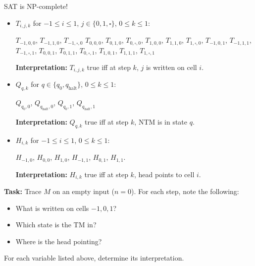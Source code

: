 \documentclass{beamer}
\begin{document}
\begin{frame}{SAT is NP-complete!}
\begin{itemize}
    \item $T_{i, j, k}$ for $-1 \leq i \leq 1$, $j \in \{0, 1, \square\}$, $0 \leq k \leq 1$:
    
   $T_{-1, 0, 0}$, $T_{-1, 1, 0}$, $T_{-1, \square, 0}$ $T_{0, 0, 0}$, $T_{0, 1, 0}$, $T_{0, \square, 0}$, $T_{1, 0, 0}$, $T_{1, 1, 0}$, $T_{1, \square, 0}$,
   $T_{-1, 0, 1}$, $T_{-1, 1, 1}$, $T_{-1, \square, 1}$, $T_{0, 0, 1}$, $T_{0, 1, 1}$, $T_{0, \square, 1}$, $T_{1, 0, 1}$, $T_{1, 1, 1}$, $T_{1, \square, 1}$
   
   \textbf{Interpretation:} $T_{i, j, k}$ true iff at step $k$, $j$ is written on cell $i$.
   
   \item $Q_{q, k}$ for $q \in \{q_0, q_\text{halt}\}$, $0 \leq k \leq 1$:
   
    $Q_{q_0, 0}$, $Q_{q_\text{halt}, 0}$, $Q_{q_0, 1}$, $Q_{q_\text{halt}, 1}$
    
    \textbf{Interpretation:} $Q_{q, k}$ true iff at step $k$, NTM is in state $q$.
    
   \item $H_{i, k}$ for $-1 \leq i \leq 1$, $0 \leq k \leq 1$:
   
    $H_{-1, 0}$, $H_{0, 0}$, $H_{1, 0}$, $H_{-1, 1}$, $H_{0, 1}$, $H_{1, 1}$. 
    
    \textbf{Interpretation:} $H_{i, k}$ true iff at step $k$, head points to cell $i$.
    
\end{itemize}


\vspace{2mm} \pause

\textbf{Task:} Trace $M$ on an empty input ($n = 0$). For each step, note the following:
\begin{itemize}
    \item What is written on cells $-1, 0, 1$?
    \item Which state is the TM in?
    \item Where is the head pointing?
\end{itemize}
For each variable listed above, determine its interpretation.

\end{frame}
\end{document}
